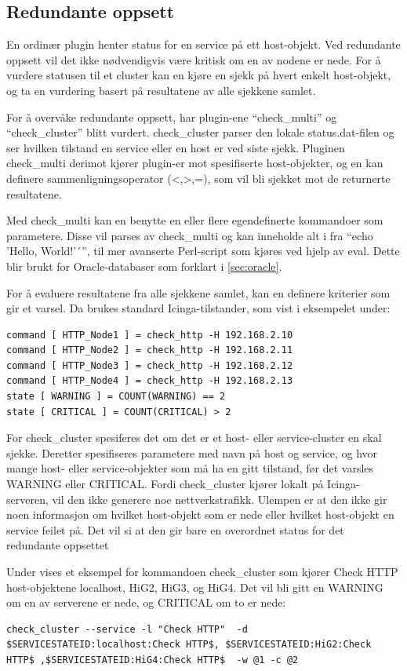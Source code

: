 \subsection{Redundante oppsett}
En ordinær plugin henter status for en service på ett host-objekt. Ved redundante oppsett vil det ikke nødvendigvis være kritisk om en av nodene er nede. For å vurdere statusen til et cluster kan en kjøre en sjekk på hvert enkelt host-objekt, og ta en vurdering basert på resultatene av alle sjekkene samlet.

For å overvåke redundante oppsett, har plugin-ene ``check\_multi'' \cite{checkmulti} og ``check\_cluster'' \cite{checkcluster} blitt vurdert. check\_cluster parser den lokale status.dat-filen og ser hvilken tilstand en service eller en host er ved siste sjekk. Pluginen check\_multi derimot kjører plugin-er mot spesifiserte host-objekter, og en kan definere sammenligningsoperator (<,>,=), som vil bli sjekket mot de returnerte resultatene.

Med check\_multi kan en benytte en eller flere egendefinerte kommandoer som parametere. Disse vil parses av check\_multi og kan inneholde alt i fra ``echo 'Hello, World!'´'', til mer avanserte Perl-script som kjøres ved hjelp av eval. Dette blir brukt for Oracle-databaser som forklart i \ref{sec:oracle}. 

For å evaluere resultatene fra alle sjekkene samlet, kan en definere kriterier som gir et varsel. Da brukes standard Icinga-tilstander, som vist i eksempelet under:
\begin{lstlisting}[style=example]
command [ HTTP_Node1 ] = check_http -H 192.168.2.10
command [ HTTP_Node2 ] = check_http -H 192.168.2.11
command [ HTTP_Node3 ] = check_http -H 192.168.2.12
command [ HTTP_Node4 ] = check_http -H 192.168.2.13
state [ WARNING ] = COUNT(WARNING) == 2
state [ CRITICAL ] = COUNT(CRITICAL) > 2
\end{lstlisting}
For check\_cluster spesiferes det om det er et host- eller service-cluster en skal sjekke. Deretter spesifiseres parametere med navn på host og service, og hvor mange host- eller service-objekter som må ha en gitt tilstand, før det varsles WARNING eller CRITICAL. Fordi check\_cluster kjører lokalt på Icinga-serveren, vil den ikke generere noe nettverkstrafikk. Ulempen er at den ikke gir noen informasjon om hvilket host-objekt som er nede eller hvilket host-objekt en service feilet på. Det vil si at den gir bare en overordnet status for det redundante oppsettet     

Under vises et eksempel for kommandoen check\_cluster som kjører Check HTTP host-objektene localhost, HiG2, HiG3, og HiG4. Det vil bli gitt en WARNING om en av serverene er nede, og CRITICAL om to er nede: 
\begin{lstlisting}[style=example]
check_cluster --service -l "Check HTTP"  -d $SERVICESTATEID:localhost:Check HTTP$, $SERVICESTATEID:HiG2:Check HTTP$ ,$SERVICESTATEID:HiG4:Check HTTP$  -w @1 -c @2
\end{lstlisting}

